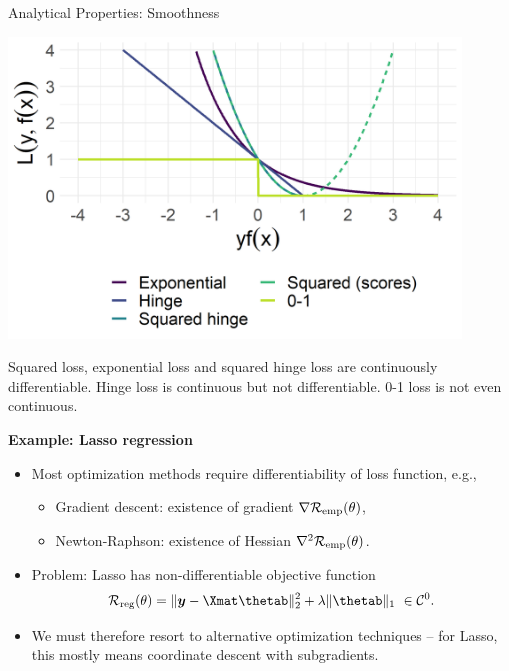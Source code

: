 \begin{vbframe}{Analytical Properties: Smoothness}
\begin{minipage}[c]{0.4\textwidth}
  \includegraphics[width=0.9\textwidth]{figure/plot_loss_overview_classif}
\end{minipage}%
\begin{minipage}[c]{0.05\textwidth}
  \phantom{foo}
\end{minipage}%
\begin{minipage}[c]{0.55\textwidth}
  \footnotesize \raggedright
  Squared loss, exponential loss and squared hinge loss are continuously 
  differentiable. Hinge loss is continuous but not differentiable. 
  0-1 loss is not even continuous.
\end{minipage}%

\framebreak

\small
\textbf{Example: Lasso regression}

\begin{itemize}
  \small
  \item Most optimization methods require differentiability of loss 
  function, e.g.,
  \begin{itemize}
    \small
    \item Gradient descent: existence of gradient $\nabla \mathcal{R}_{\text{emp}}(\theta)$, 
    \item Newton-Raphson: existence of Hessian $\nabla^2 \mathcal{R}_{\text{emp}}(\theta)$.
  \end{itemize}
  \item Problem: Lasso has non-differentiable 
  objective function $$\riskrt = \| \yv - \Xmat \thetab \|^2_2
  + \lambda \| 
  \thetab \|_1 ~ \in \mathcal{C}^0.$$
  \item We must therefore resort to alternative optimization 
  techniques -- for Lasso, this mostly means coordinate descent with 
  subgradients.
\end{itemize}


\end{vbframe}
